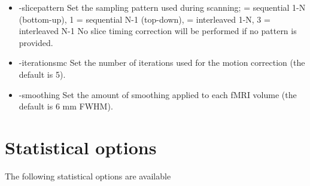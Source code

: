 \begin{itemize}

\item -slicepattern
\newline \newline Set the sampling pattern used during scanning;  = sequential 1-N (bottom-up), 1 = sequential N-1 (top-down),  = interleaved 1-N, 3 = interleaved N-1 \newline \newline
                  No slice timing correction will be performed if no pattern is provided. 

\item -iterationsmc 
\newline \newline Set the number of iterations used for the \newline motion correction (the default is 5).

\item -smoothing 
\newline \newline Set the amount of smoothing applied to \newline each fMRI volume (the default is 6 mm FWHM). 

\end{itemize}


\section{Statistical options}

The following statistical options are available


